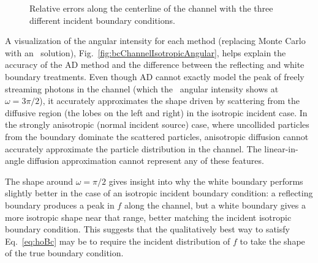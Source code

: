 \begin{figure}[tb]
  \centering
  \centering\small
  \hspace{-.25in}%
  
  \caption{Relative errors along the centerline of the channel with the three
  different incident boundary conditions.}
  \label{fig:adbcRelErr}
\end{figure}

A visualization of the angular intensity for each method (replacing Monte Carlo with
an \SN\ solution), Fig.~\ref{fig:bcChannelIsotropicAngular}, helps explain the
accuracy
of the AD method and the difference between the reflecting and white boundary
treatments. Even though AD cannot exactly model the peak of freely streaming
photons in the channel (which the \SN\ angular intensity shows at $\omega=3\pi/2$),
it accurately approximates the shape driven by scattering from the
diffusive region (the lobes on the left and right) in the isotropic incident
case. In the strongly anisotropic (normal incident source) case, where
uncollided particles from the boundary dominate the scattered particles,
anisotropic diffusion cannot accurately approximate the particle
distribution in the channel.
The linear-in-angle diffusion approximation cannot represent any of these
features.

\begin{figure}[htb]
  \centering\small
  \subfloat[Isotropic]{%
  \label{fig:bcChannelIsotropicAngular}
  \vspace{-.25in}%
  }%
  \subfloat[Normal]{%
  \label{fig:bcChannelDeltaAngular}
  \vspace{-.25in}%
  }%
  \label{fig:bcChannelAngular}
\end{figure}

The shape around $\omega=\pi/2$ gives insight into why the white boundary
performs slightly better in the case of an isotropic incident boundary
condition: a reflecting boundary produces a peak in $f$
along the channel, but a white boundary gives a more isotropic shape near that
range, better matching the incident isotropic boundary condition. This suggests
that the qualitatively best way to satisfy Eq.~\eqref{eq:hoBc} may be
to require the incident distribution of $f$ to take the shape of the true
boundary condition.

